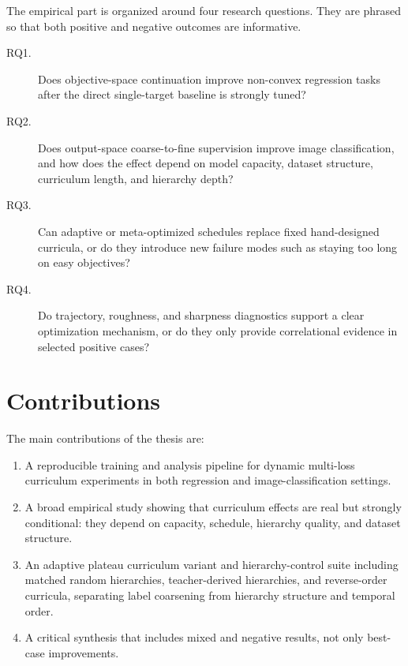 \documentclass[english,master,a4paper,oneside]{ppfcmthesis}
\begin{document}
The empirical part is organized around four research questions. They are phrased
so that both positive and negative outcomes are informative.

\begin{description}
    \item[RQ1.]\label{rq:continuation} Does objective-space
          continuation improve non-convex regression tasks after the direct
          single-target baseline is strongly tuned?
    \item[RQ2.]\label{rq:vision} Does output-space coarse-to-fine
          supervision improve image classification, and how does the effect
          depend on model capacity, dataset structure, curriculum length, and
          hierarchy depth?
    \item[RQ3.]\label{rq:adaptive} Can adaptive or meta-optimized
          schedules replace fixed hand-designed curricula, or do they introduce
          new failure modes such as staying too long on easy objectives?
    \item[RQ4.]\label{rq:diagnostics} Do trajectory, roughness,
          and sharpness diagnostics support a clear optimization mechanism, or do
          they only provide correlational evidence in selected positive cases?
\end{description}

\section{Contributions}

The main contributions of the thesis are:

\begin{enumerate}
    \item A reproducible training and analysis pipeline for dynamic multi-loss
          curriculum experiments in both regression and image-classification
          settings.
    \item A broad empirical study showing that curriculum effects are real but
          strongly conditional: they depend on capacity, schedule, hierarchy
          quality, and dataset structure.
    \item An adaptive plateau curriculum variant and hierarchy-control suite
          including matched random hierarchies, teacher-derived hierarchies, and
          reverse-order curricula, separating label coarsening from hierarchy
          structure and temporal order.
    \item A critical synthesis that includes mixed and negative results, not only
          best-case improvements.
\end{enumerate}
\end{document}
